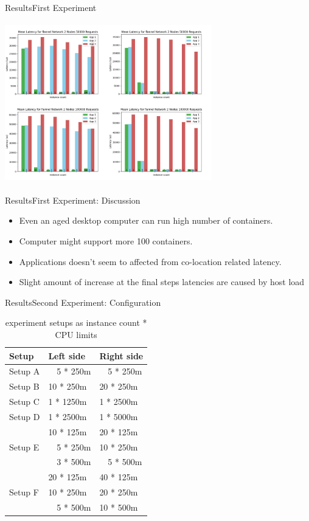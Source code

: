 \documentclass{beamer}
\begin{document}
\begin{frame}{Results}{First Experiment}
  \begin{center}
   \includegraphics[height=7cm, width=9cm]{figures/flannel.png}
  \end{center}
\end{frame}

\begin{frame}{Results}{First Experiment: Discussion}
 \begin{itemize}
  \item Even an aged desktop computer can run high number of containers.
  \item Computer might support more 100 containers.
  \item Applications doesn't seem to affected from co-location related latency.
  \item Slight amount of increase at the final steps latencies are caused by host load
 \end{itemize}
\end{frame}

\begin{frame}{Results}{Second Experiment: Configuration}
\begin{table}[h]
\centering
\begin{tabular}{ |l|l|l| }
\hline
Setup & Left side & Right side \\ \hline
Setup A &  ~~5 *  250m & ~~5 *  250m \\
Setup B & 10 *  250m &  20 *  250m \\
Setup C &  1 * 1250m &   1 * 2500m \\
Setup D &  1 * 2500m &   1 * 5000m \\ \hline
\multirow{3}{*}{Setup E} 
 & 10 *  125m & 20 *  125m \\
 &  ~~5 *  250m & 10 *  250m \\
 &  ~~3 *  500m & ~~5 *  500m \\ \hline
\multirow{3}{*}{Setup F}
 & 20 *  125m & 40 *  125m \\
 & 10 *  250m & 20 *  250m \\
 &  ~~5 *  500m & 10 *  500m \\ \hline
\end{tabular}
\caption{experiment setups as instance count * CPU limits}
\end{table}
\end{frame}
\end{document}
